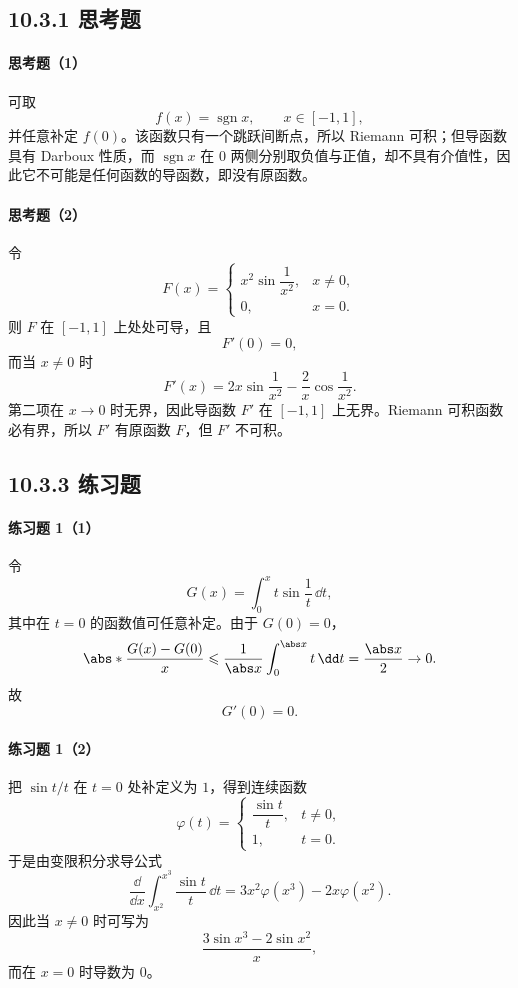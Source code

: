 \subsection*{10.3.1 思考题}

\paragraph{思考题（1）}
\begin{xsolution}
可取
\[
  f(x)=\operatorname{sgn}x,\qquad x\in[-1,1],
\]
并任意补定 $f(0)$。该函数只有一个跳跃间断点，所以 Riemann 可积；但导函数具有 Darboux 性质，而 $\operatorname{sgn}x$ 在 $0$ 两侧分别取负值与正值，却不具有介值性，因此它不可能是任何函数的导函数，即没有原函数。
\end{xsolution}

\paragraph{思考题（2）}
\begin{xsolution}
令
\[
  F(x)=
  \begin{cases}
    x^2\sin\dfrac1{x^2},&x\ne0,\\
    0,&x=0.
  \end{cases}
\]
则 $F$ 在 $[-1,1]$ 上处处可导，且
\[
  F'(0)=0,
\]
而当 $x\ne0$ 时
\[
  F'(x)=2x\sin\frac1{x^2}-\frac2x\cos\frac1{x^2}.
\]
第二项在 $x\to0$ 时无界，因此导函数 $F'$ 在 $[-1,1]$ 上无界。Riemann 可积函数必有界，所以 $F'$ 有原函数 $F$，但 $F'$ 不可积。
\end{xsolution}

\subsection*{10.3.3 练习题}

\paragraph{练习题 1（1）}
\begin{xsolution}
令
\[
  G(x)=\int_0^x t\sin\frac1t\,\dd t,
\]
其中在 $t=0$ 的函数值可任意补定。由于 $G(0)=0$，
\[
  \abs*{\frac{G(x)-G(0)}x}
  \leqslant\frac1{\abs x}\int_0^{\abs x}t\,\dd t
  =\frac{\abs x}{2}\to0.
\]
故
\[
  \boxed{G'(0)=0}.
\]
\end{xsolution}

\paragraph{练习题 1（2）}
\begin{xsolution}
把 $\sin t/t$ 在 $t=0$ 处补定义为 $1$，得到连续函数
\[
  \varphi(t)=
  \begin{cases}
    \dfrac{\sin t}{t},&t\ne0,\\
    1,&t=0.
  \end{cases}
\]
于是由变限积分求导公式
\[
  \frac{\dd}{\dd x}\int_{x^2}^{x^3}\frac{\sin t}{t}\,\dd t
  =3x^2\varphi(x^3)-2x\varphi(x^2).
\]
因此当 $x\ne0$ 时可写为
\[
  \boxed{\frac{3\sin x^3-2\sin x^2}{x}},
\]
而在 $x=0$ 时导数为 $0$。
\end{xsolution}

